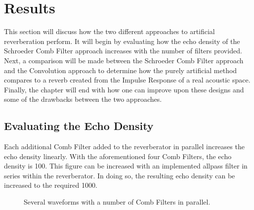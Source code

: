 \chapter{Results}
\hspace*{-0.18cm}This section will discuss how the two different approaches to artificial reverberation perform. It will begin by evaluating how the echo density of the Schroeder Comb Filter approach increases with the number of filters provided. Next, a comparison will be made between the Schroeder Comb Filter approach and the Convolution approach to determine how the purely artificial method compares to a reverb created from the Impulse Response of a real acoustic space. Finally, the chapter will end with how one can improve upon these designs and some of the drawbacks between the two approaches.

\section{Evaluating the Echo Density}
Each additional Comb Filter added to the reverberator in parallel increases the echo density linearly. With the aforementioned four Comb Filters, the echo density is 100. This figure can be increased with an implemented allpass filter in series within the reverberator. In doing so, the resulting echo density can be increased to the required 1000.

\begin{figure}[h] %
	\begin{center}
		\caption{Several waveforms with a number of Comb Filters in parallel.}
	\end{center}
\end{figure}


